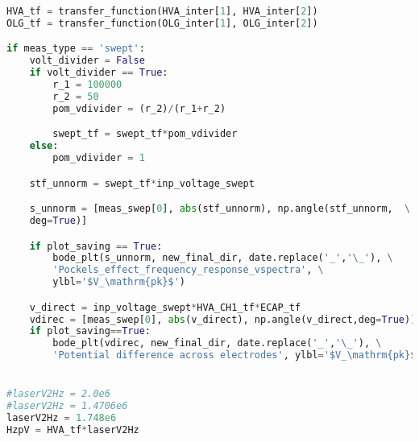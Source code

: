 \begin{lstlisting}[frame=single, language=Python]
HVA_tf = transfer_function(HVA_inter[1], HVA_inter[2])                       # combine amplitude and phase of HVACH3 and OLG
OLG_tf = transfer_function(OLG_inter[1], OLG_inter[2])

if meas_type == 'swept':
    volt_divider = False                                                     # Voltage divider if you want a smaller normalization factor
    if volt_divider == True:                                                 # Voltage divider with r_1 as the first resistor and r_2 as the resistor connected to ground
        r_1 = 100000
        r_2 = 50
        pom_vdivider = (r_2)/(r_1+r_2)

        swept_tf = swept_tf*pom_vdivider
    else:
        pom_vdivider = 1

    stf_unnorm = swept_tf*inp_voltage_swept                                  # Unnormalized transfer function measurement

    s_unnorm = [meas_swep[0], abs(stf_unnorm), np.angle(stf_unnorm,  \
    deg=True)]                                                               # Unnormalized transfer function in triad format

    if plot_saving == True:                                                  # Plot voltage spectra for transfer function measurement if requested
        bode_plt(s_unnorm, new_final_dir, date.replace('_','\_'), \
        'Pockels_effect_frequency_response_vspectra', \
        ylbl='$V_\mathrm{pk}$')

    v_direct = inp_voltage_swept*HVA_CH1_tf*ECAP_tf                          # This is the voltage directly across the coating for all measured frequencies (with phase information)
    vdirec = [meas_swep[0], abs(v_direct), np.angle(v_direct,deg=True)]      # Frequency dependent injection voltage (transfer function triad)
    if plot_saving==True:                                                    # Plot frequency dependent injection voltage if requested
        bode_plt(vdirec, new_final_dir, date.replace('_','\_'), \
        'Potential difference across electrodes', ylbl='$V_\mathrm{pk}$')


#laserV2Hz = 2.0e6
#laserV2Hz = 1.4706e6                                                        # measurement from elog 831 (05-24-2021)
laserV2Hz = 1.748e6                                                          # Laser PZT response acquired from PDH measurement
HzpV = HVA_tf*laserV2Hz                                                      # Actuation function A(f) = A_1(f)*A_2(f)


\end{lstlisting}
